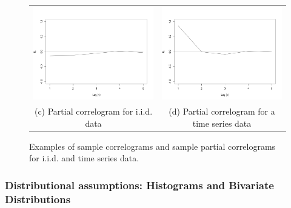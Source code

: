 \begin{figure}
\begin{center}
\begin{tabular}{cc}
\includegraphics[scale=0.25]{./figures/PartialCorrelogramGaussian} &
\includegraphics[scale=0.25]{./figures/PartialCorrelogramTimeSerie} \\
(c) Partial correlogram for i.i.d. data & (d) Partial correlogram for a time series data \\
\end{tabular}
\caption{\label{Figure:PreliminariesCorrelograms} Examples of sample correlograms and sample partial correlograms for i.i.d. and time series data. 
}
\end{center}
\end{figure}

\subsubsection*{Distributional assumptions: Histograms and Bivariate Distributions}

